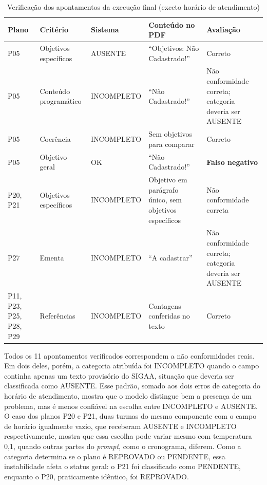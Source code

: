 \begin{table}[H]
\centering
\caption{Verificação dos apontamentos da execução final (exceto horário de atendimento)}
\label{tab:erros}
\footnotesize
\begin{tabular}{@{}L{1.1cm}L{2.8cm}L{2.4cm}L{4.3cm}L{3.6cm}@{}}
\toprule
{}
\textbf{Plano} & \textbf{Critério} & \textbf{Sistema} & \textbf{Conteúdo no PDF} & \textbf{Avaliação} \\ \midrule
P05 & Objetivos específicos & AUSENTE & ``Objetivos: Não Cadastrado!'' & Correto \\
P05 & Conteúdo programático & INCOMPLETO & ``Não Cadastrado!'' & Não conformidade correta; categoria deveria ser AUSENTE \\
P05 & Coerência & INCOMPLETO & Sem objetivos para comparar & Correto \\
P05 & Objetivo geral & OK & ``Não Cadastrado!'' & \textbf{Falso negativo} \\
P20, P21 & Objetivos específicos & INCOMPLETO & Objetivo em parágrafo único, sem objetivos específicos & Não conformidade correta \\
P27 & Ementa & INCOMPLETO & ``A cadastrar'' & Não conformidade correta; categoria deveria ser AUSENTE \\
P11, P23, P25, P28, P29 & Referências & INCOMPLETO & Contagens conferidas no texto & Correto \\ \bottomrule
\end{tabular}
\end{table}

Todos os 11 apontamentos verificados correspondem a não conformidades reais. Em dois deles, porém, a categoria atribuída foi INCOMPLETO quando o campo continha apenas um texto provisório do SIGAA, situação que deveria ser classificada como AUSENTE. Esse padrão, somado aos dois erros de categoria do horário de atendimento, mostra que o modelo distingue bem a presença de um problema, mas é menos confiável na escolha entre INCOMPLETO e AUSENTE. O caso dos planos P20 e P21, duas turmas do mesmo componente com o campo de horário igualmente vazio, que receberam AUSENTE e INCOMPLETO respectivamente, mostra que essa escolha pode variar mesmo com temperatura 0,1, quando outras partes do \textit{prompt}, como o cronograma, diferem. Como a categoria determina se o plano é REPROVADO ou PENDENTE, essa instabilidade afeta o status geral: o P21 foi classificado como PENDENTE, enquanto o P20, praticamente idêntico, foi REPROVADO.

